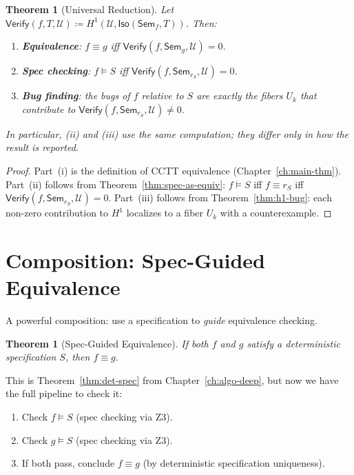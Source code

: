\documentclass[11pt,a4paper]{report}
\theoremstyle{definition}
\theoremstyle{plain}
\newtheorem{theorem}[definition]{Theorem}
\newcommand{\covers}{\mathcal{U}}
\newcommand{\Sem}{\mathsf{Sem}}
\newcommand{\Iso}{\mathsf{Iso}}
\newcommand{\Hone}{H^1}
\begin{document}
\begin{theorem}[Universal Reduction]
\label{thm:universal-reduction}
Let $\mathsf{Verify}(f, T, \covers) \coloneqq
\Hone(\covers, \Iso(\Sem_f, T))$.  Then:
\begin{enumerate}[label=(\roman*)]
  \item \textbf{Equivalence}: $f \equiv g$ iff
    $\mathsf{Verify}(f, \Sem_g, \covers) = 0$.
  \item \textbf{Spec checking}: $f \models S$ iff
    $\mathsf{Verify}(f, \Sem_{r_S}, \covers) = 0$.
  \item \textbf{Bug finding}: the bugs of $f$ relative to $S$ are
    exactly the fibers $U_k$ that contribute to
    $\mathsf{Verify}(f, \Sem_{r_S}, \covers) \neq 0$.
\end{enumerate}
In particular, (ii) and (iii) use the same computation; they differ
only in how the result is reported.
\end{theorem}

\begin{proof}
Part~(i) is the definition of CCTT equivalence
(Chapter~\ref{ch:main-thm}).  Part~(ii) follows from
Theorem~\ref{thm:spec-as-equiv}: $f \models S$ iff $f \equiv r_S$
iff $\mathsf{Verify}(f, \Sem_{r_S}, \covers) = 0$.  Part~(iii)
follows from Theorem~\ref{thm:h1-bug}: each non-zero contribution
to $\Hone$ localizes to a fiber $U_k$ with a counterexample.
\end{proof}

\section{Composition: Spec-Guided Equivalence}

A powerful composition: use a specification to \emph{guide}
equivalence checking.

\begin{theorem}[Spec-Guided Equivalence]
If both $f$ and $g$ satisfy a deterministic specification $S$,
then $f \equiv g$.
\end{theorem}

This is Theorem~\ref{thm:det-spec} from Chapter~\ref{ch:algo-deep},
but now we have the full pipeline to check it:
\begin{enumerate}
  \item Check $f \models S$ (spec checking via Z3).
  \item Check $g \models S$ (spec checking via Z3).
  \item If both pass, conclude $f \equiv g$ (by deterministic
    specification uniqueness).
\end{enumerate}
\end{document}
